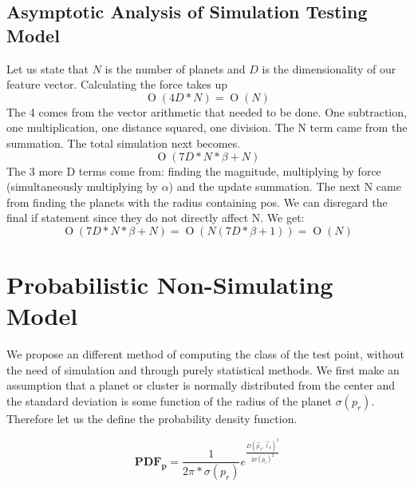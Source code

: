 \documentclass[journal]{IEEEtran}
\newcommand{\BigO}[1]{\ensuremath{\operatorname{O}\left(#1\right)}}
\begin{document}
\subsection{Asymptotic Analysis of Simulation Testing Model}
Let us state that $N$ is the number of planets and $D$ is the dimensionality of our feature vector. Calculating the force takes up 
\begin{equation}
\BigO{4D*N} = \BigO{N} 
\end{equation}
The 4 comes from the vector arithmetic that needed to be done. One subtraction, one multiplication, one distance squared, one division. The N term came from the summation. The total simulation next becomes.
\begin{equation}
\BigO{7D*N *\beta + N} 
\end{equation}
The 3 more D terms come from: finding the magnitude, multiplying by force (simultaneously multiplying by $\alpha$) and the update summation. The next N came from finding the planets with the radius containing pos. We can disregard the final if statement since they do not directly affect N. We get:
\begin{equation}
\BigO{7D*N *\beta + N} = \BigO{N(7D*\beta+1) }=\BigO{N}  
\end{equation} 

\section{Probabilistic Non-Simulating Model}
We propose an different method of computing the class of the test point, without the need of simulation and through purely statistical methods. We first make an assumption that a planet or cluster is normally distributed from the center and the standard deviation is some function of the radius of the planet $\sigma(p_r)$. Therefore let us the define the probability density function.

\begin{equation}
\mathbf{PDF_p} = \frac{1}{2\pi*\sigma(p_r)} e ^ \frac{D(\overrightarrow{p}_x,\overrightarrow{l}_x)^2}{2\sigma(p_r)^2}
\end{equation}
\end{document}
